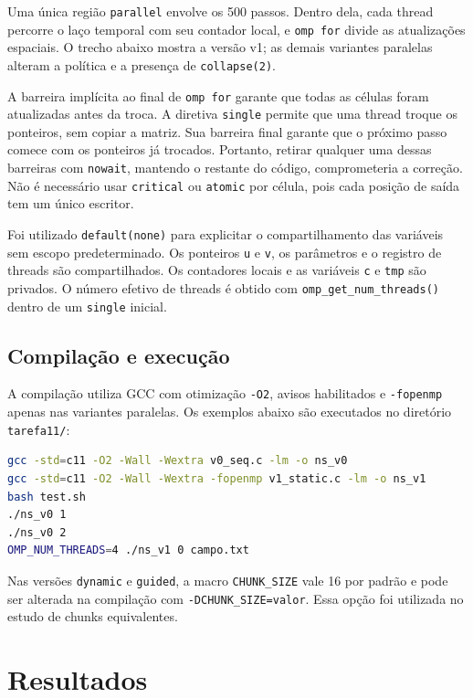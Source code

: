 \documentclass[11pt,letterpaper]{article}
\begin{document}
Uma única região \texttt{parallel} envolve os 500 passos. Dentro dela, cada thread percorre o laço temporal com seu contador local, e \texttt{omp for} divide as atualizações espaciais. O trecho abaixo mostra a versão v1; as demais variantes paralelas alteram a política e a presença de \texttt{collapse(2)}.



A barreira implícita ao final de \texttt{omp for} garante que todas as células foram atualizadas antes da troca. A diretiva \texttt{single} permite que uma thread troque os ponteiros, sem copiar a matriz. Sua barreira final garante que o próximo passo comece com os ponteiros já trocados. Portanto, retirar qualquer uma dessas barreiras com \texttt{nowait}, mantendo o restante do código, comprometeria a correção. Não é necessário usar \texttt{critical} ou \texttt{atomic} por célula, pois cada posição de saída tem um único escritor.

Foi utilizado \texttt{default(none)} para explicitar o compartilhamento das variáveis sem escopo predeterminado. Os ponteiros \texttt{u} e \texttt{v}, os parâmetros e o registro de threads são compartilhados. Os contadores locais e as variáveis \texttt{c} e \texttt{tmp} são privados. O número efetivo de threads é obtido com \texttt{omp\_get\_num\_threads()} dentro de um \texttt{single} inicial.

\subsection{Compilação e execução}
A compilação utiliza GCC com otimização \texttt{-O2}, avisos habilitados e \texttt{-fopenmp} apenas nas variantes paralelas. Os exemplos abaixo são executados no diretório \texttt{tarefa11/}:
\begin{lstlisting}[language=bash,caption={Compilação, validação e execução.}]
gcc -std=c11 -O2 -Wall -Wextra v0_seq.c -lm -o ns_v0
gcc -std=c11 -O2 -Wall -Wextra -fopenmp v1_static.c -lm -o ns_v1
bash test.sh
./ns_v0 1
./ns_v0 2
OMP_NUM_THREADS=4 ./ns_v1 0 campo.txt
\end{lstlisting}
Nas versões \texttt{dynamic} e \texttt{guided}, a macro \texttt{CHUNK\_SIZE} vale 16 por padrão e pode ser alterada na compilação com \texttt{-DCHUNK\_SIZE=valor}. Essa opção foi utilizada no estudo de chunks equivalentes.

\section{Resultados}
\end{document}
